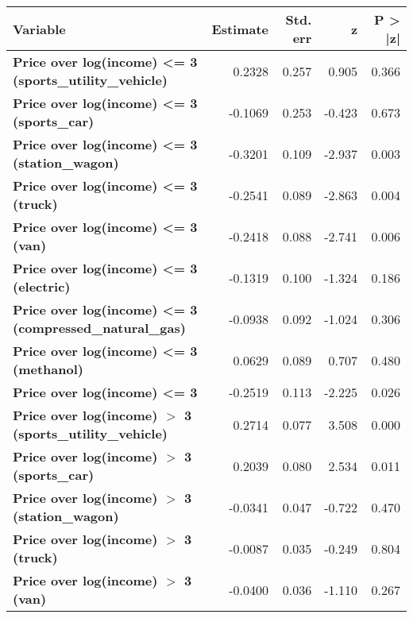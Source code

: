 \begin{tabular}{lrrrr}
\toprule
\textbf{Variable} & \textbf{Estimate} & \textbf{Std. err} & \textbf{z} & \textbf{P > |z| }  \\
\midrule
\textbf{Price over log(income) <= 3 (sports\_utility\_vehicle)}  &       0.2328  &        0.257     &     0.905  &         0.366        \\
\textbf{Price over log(income) <= 3 (sports\_car)}               &      -0.1069  &        0.253     &    -0.423  &         0.673        \\
\textbf{Price over log(income) <= 3 (station\_wagon)}            &      -0.3201  &        0.109     &    -2.937  &         0.003        \\
\textbf{Price over log(income) <= 3 (truck)}                     &      -0.2541  &        0.089     &    -2.863  &         0.004        \\
\textbf{Price over log(income) <= 3 (van)}                       &      -0.2418  &        0.088     &    -2.741  &         0.006        \\
\textbf{Price over log(income) <= 3 (electric)}                  &      -0.1319  &        0.100     &    -1.324  &         0.186        \\
\textbf{Price over log(income) <= 3 (compressed\_natural\_gas)}  &      -0.0938  &        0.092     &    -1.024  &         0.306        \\
\textbf{Price over log(income) <= 3 (methanol)}                  &       0.0629  &        0.089     &     0.707  &         0.480        \\
\textbf{Price over log(income) <= 3}                             &      -0.2519  &        0.113     &    -2.225  &         0.026        \\
\textbf{Price over log(income) $>$ 3 (sports\_utility\_vehicle)} &       0.2714  &        0.077     &     3.508  &         0.000        \\
\textbf{Price over log(income) $>$ 3 (sports\_car)}              &       0.2039  &        0.080     &     2.534  &         0.011        \\
\textbf{Price over log(income) $>$ 3 (station\_wagon)}           &      -0.0341  &        0.047     &    -0.722  &         0.470        \\
\textbf{Price over log(income) $>$ 3 (truck)}                    &      -0.0087  &        0.035     &    -0.249  &         0.804        \\
\textbf{Price over log(income) $>$ 3 (van)}                      &      -0.0400  &        0.036     &    -1.110  &         0.267        \\

\end{tabular}
